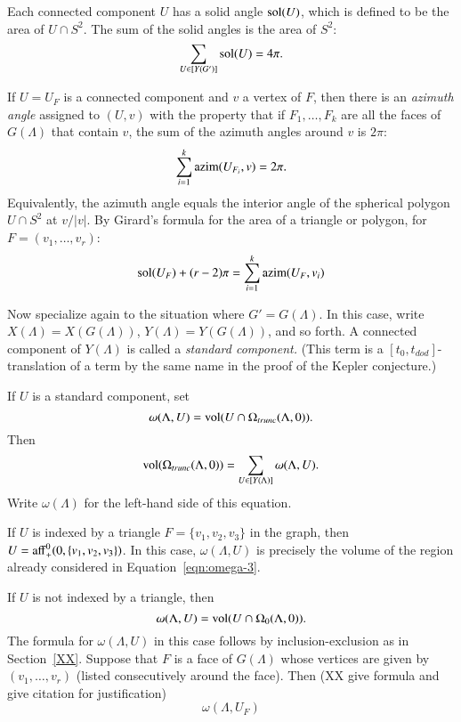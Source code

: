 Each connected component $U$ has a solid angle $\operatorname{sol}(U)$, which
is defined to be the area of $U\cap S^2$.  The sum of the
solid angles is the area of $S^2$:
 $$
 \sum_{U\in[Y(G')]} \operatorname{sol}(U) = 4\pi.
 $$

If $U=U_F$ is a connected component and $v$ a vertex of $F$, then there
is an {\it azimuth angle} assigned to $(U,v)$ with the property
that if $F_1,\ldots,F_k$ are all the faces of $G(\Lambda)$
that contain $v$, the sum of the azimuth angles around
$v$ is $2\pi$:
  $$
  \sum_{i=1}^k {\operatorname{azim}}(U_{F_i},v) = 2\pi.
  $$
Equivalently, 
the azimuth angle equals the interior angle of the spherical
polygon $U\cap S^2$ at $v/|v|$.  By Girard's formula for
the area of a triangle or polygon,  for
$F = (v_1,\ldots,v_r)$:
  $$
  \operatorname{sol}(U_F) + (r-2)\pi = \sum_{i=1}^k {\operatorname{azim}}(U_F,v_i)
  $$

Now specialize again to the situation where $G'=G(\Lambda)$.
In this case, write $X(\Lambda)=X(G(\Lambda))$, $Y(\Lambda)=Y(G(\Lambda))$,
and so forth.
A connected component of $Y(\Lambda)$
is called a {\it standard component.}  (This term is a
$[t_0,t_{dod}]$-translation of a term by the same name
in the proof of the Kepler conjecture.)

If $U$ is a standard component, set
  $$\omega(\Lambda,U) = {\operatorname{vol}}(U\cap \Omega_{trunc}(\Lambda,0)).$$
Then
  $${\operatorname{vol}}(\Omega_{trunc}(\Lambda,0)) = 
  \sum_{U\in[Y(\Lambda)]} \omega(\Lambda,U).$$
Write $\omega(\Lambda)$ for the left-hand side of this equation.

If $U$ is indexed by a triangle $F=\{v_1,v_2,v_3\}$ in the graph,
then $U = {\operatorname{aff}}_+^0(0,\{v_1,v_2,v_3\})$.  In this case,
$\omega(\Lambda,U)$ is precisely the volume of the region
already considered in Equation~\ref{eqn:omega-3}.

If $U$ is not indexed by a triangle, then
   $$\omega(\Lambda,U) = {\operatorname{vol}}(U\cap\Omega_0(\Lambda,0)).$$
The formula for $\omega(\Lambda,U)$ in this case follows
by inclusion-exclusion as in Section~\ref{XX}.  Suppose
that $F$ is a face of $G(\Lambda)$ whose vertices are given
by $(v_1,\ldots,v_r)$ (listed consecutively around the face).
Then (XX give formula and give citation for justification)
$$
\omega(\Lambda,U_F) 
$$

